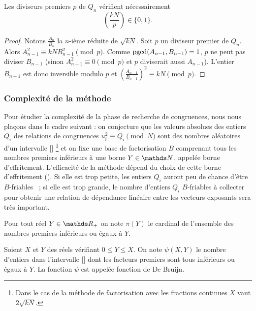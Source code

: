 \begin{proposition}
	Les diviseurs premiers $p$ de $Q_n$ vérifient nécessairement
	\[\left(\frac{kN}{p} \right) \in \{0, 1\}.\]
\end{proposition}

\begin{proof}
    Notons $\frac{A_n}{B_n}$ la $n$-ième réduite de $\sqrt{kN}$. 
    Soit $p$ un diviseur premier de $Q_n$. Alors $ A_{n-1}^2 \equiv kNB_{n-1}^2
	\pmod{p}$. Comme $\operatorname{pgcd}(A_{n-1},B_{n-1}) = 1$, $p$ ne peut pas diviser
	$B_{n-1}$ (sinon $A_{n-1}^2 \equiv 0 \pmod{p}$ et $p$ diviserait aussi
	$A_{n-1}$). L'entier $B_{n-1}$ est donc inversible modulo $p$ et $\left(
	\frac{A_{n-1}}{B_{n-1}}\right )^2 \equiv kN \pmod{p}$.
\end{proof}

\subsubsection{Complexité de la méthode}

Pour étudier la complexité de la phase de recherche de congruences, nous nous
plaçons dans le cadre suivant : on conjecture que les valeurs absolues des
entiers $Q_i$ des relations de congruences $u_i^2 \equiv Q_i \pmod{N}$ sont des
nombres aléatoires d'un intervalle [\![1, X]\!] \footnote{Dans le cas de la
méthode de factorisation avec les fractions continues $X$ vaut $2\sqrt{kN}$. }
et on fixe une base de factorisation $B$ comprenant tous les nombres premiers
inférieurs à une borne $Y \in \N$, appelée borne d'effritement. L'efficacité de
la méthode dépend du choix de cette borne d'effritement (\cite{Guillot}). Si
elle est trop petite, les entiers $Q_i$ auront peu de chance d'être
$B$-friables ~; si elle est trop grande, le nombre d'entiers $Q_i$ $B$-friables
à collecter pour obtenir une relation de dépendance linéaire entre les vecteurs
exposants sera très important.

\begin{notation}
    Pour tout réel $Y \in \R_+$ on note $\pi(Y)$ le cardinal de l'ensemble des
    nombres premiers inférieurs ou égaux à $Y$.
\end{notation}

\begin{notation}
    Soient $X$ et $Y$ des réels vérifiant $0 \leq Y \leq X$. On note $\psi(X,Y)$
    le nombre d'entiers dans l'intervalle [\![1, X]\!]  dont les facteurs premiers  
    sont tous inférieurs ou égaux à $Y$. La fonction $\psi$ est appelée fonction 
    de De Bruijn.
\end{notation}

